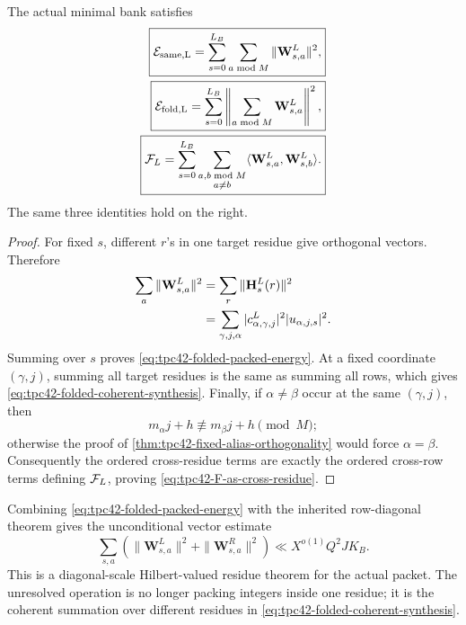 \begin{theorem}
\label{thm:tpc42-folded-residue-identity}
The actual minimal bank satisfies
\begin{align}
 \boxed{
 \mathcal E_{\rm same,L}
 =\sum_{s=0}^{L_B}\sum_{a\bmod M}
   \|\mathbf W_{s,a}^L\|^2,}
 \label{eq:tpc42-folded-packed-energy}\\
 \boxed{
 \mathcal E_{\rm fold,L}
 =\sum_{s=0}^{L_B}
   \left\|\sum_{a\bmod M}\mathbf W_{s,a}^L\right\|^2,}
 \label{eq:tpc42-folded-coherent-synthesis}\\
 \boxed{
 \mathcal F_L
 =\sum_{s=0}^{L_B}
   \sum_{\substack{a,b\bmod M\\a\ne b}}
   \langle\mathbf W_{s,a}^L,\mathbf W_{s,b}^L\rangle.}
 \label{eq:tpc42-F-as-cross-residue}
\end{align}
The same three identities hold on the right.
\end{theorem}

\begin{proof}
For fixed \(s\), different \(r\)'s in one target residue give orthogonal
vectors.  Therefore
\begin{align}
 \sum_a\|\mathbf W_{s,a}^L\|^2
 &=\sum_r\|\mathbf H_s^L(r)\|^2
 \notag\\
 &=\sum_{\gamma,j,\alpha}
   |c^L_{\alpha,\gamma,j}|^2|u_{\alpha,j,s}|^2.
 \label{eq:tpc42-one-folded-packet-energy}
\end{align}
Summing over \(s\) proves \eqref{eq:tpc42-folded-packed-energy}.  At a
fixed coordinate \((\gamma,j)\), summing all target residues is the same
as summing all rows, which gives
\eqref{eq:tpc42-folded-coherent-synthesis}.  Finally, if
\(\alpha\ne\beta\) occur at the same \((\gamma,j)\), then
\begin{equation}
 m_\alpha j+h\not\equiv m_\beta j+h\pmod M;
 \label{eq:tpc42-distinct-rows-distinct-residues}
\end{equation}
otherwise the proof of
\cref{thm:tpc42-fixed-alias-orthogonality} would force
\(\alpha=\beta\).  Consequently the ordered cross-residue terms are
exactly the ordered cross-row terms defining \(\mathcal F_L\), proving
\eqref{eq:tpc42-F-as-cross-residue}.
\end{proof}

Combining \eqref{eq:tpc42-folded-packed-energy} with the inherited
row-diagonal theorem gives the unconditional vector estimate
\begin{equation}
 \sum_{s,a}
 \left(
  \|\mathbf W_{s,a}^L\|^2+
  \|\mathbf W_{s,a}^R\|^2
 \right)
 \ll X^{o(1)}Q^2JK_B.
 \label{eq:tpc42-packed-vector-target}
\end{equation}
This is a diagonal-scale Hilbert-valued residue theorem for the actual
packet.  The unresolved operation is no longer packing integers inside
one residue; it is the coherent summation over different residues in
\eqref{eq:tpc42-folded-coherent-synthesis}.
